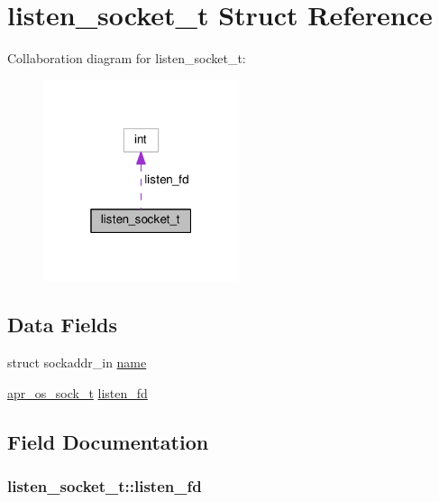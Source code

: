 \hypertarget{structlisten__socket__t}{}\section{listen\+\_\+socket\+\_\+t Struct Reference}
\label{structlisten__socket__t}


Collaboration diagram for listen\+\_\+socket\+\_\+t\+:
\nopagebreak
\begin{figure}[H]
\begin{center}
\leavevmode
\includegraphics[width=163pt]{structlisten__socket__t__coll__graph}
\end{center}
\end{figure}
\subsection*{Data Fields}
\begin{DoxyCompactItemize}
\item 
struct sockaddr\+\_\+in \hyperlink{structlisten__socket__t_a56aee878da44645daeb92d49f9af2601}{name}
\item 
\hyperlink{group__apr__portabile_ga2965cd2e48cb6513bc0ba05aa6083ed7}{apr\+\_\+os\+\_\+sock\+\_\+t} \hyperlink{structlisten__socket__t_a0077c56925f2fba2d41796336938dcc3}{listen\+\_\+fd}
\end{DoxyCompactItemize}


\subsection{Field Documentation}
\subsubsection[{\texorpdfstring{listen\+\_\+fd}{listen_fd}}]{ listen\+\_\+socket\+\_\+t\+::listen\+\_\+fd}\hypertarget{structlisten__socket__t_a0077c56925f2fba2d41796336938dcc3}{}\label{structlisten__socket__t_a0077c56925f2fba2d41796336938dcc3}

